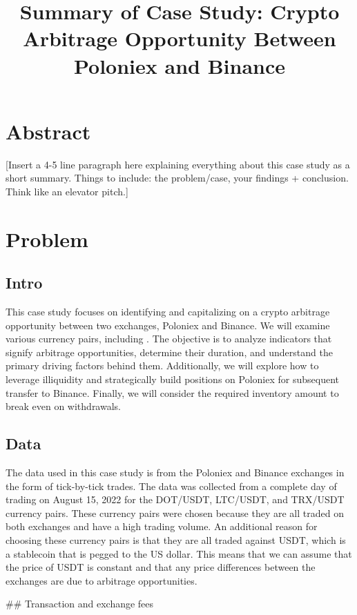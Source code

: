 \documentclass{article}
\begin{document}
\title{\textbf{Summary of Case Study: Crypto Arbitrage Opportunity Between Poloniex and Binance}}
\maketitle

\section{Abstract}
[Insert a 4-5 line paragraph here explaining everything about this case study as a short summary. Things to include: the problem/case, your findings + conclusion. Think like an elevator pitch.]

\section{Problem}
\subsection{Intro}
This case study focuses on identifying and capitalizing on a crypto arbitrage opportunity between two exchanges, Poloniex and Binance. We will examine various currency pairs, including  . The objective is to analyze indicators that signify arbitrage opportunities, determine their
duration, and understand the primary driving factors behind them. Additionally, we will explore how to
leverage illiquidity and strategically build positions on Poloniex for subsequent transfer to Binance. Finally,
we will consider the required inventory amount to break even on withdrawals.
\subsection{Data}
The data used in this case study is from the Poloniex and Binance exchanges in the form of tick-by-tick trades. The data was collected from a complete day of trading on August 15, 2022 for the DOT/USDT, LTC/USDT, and TRX/USDT currency pairs. These currency pairs were chosen because they are all traded on both exchanges and have a high trading volume. An additional reason for choosing these currency pairs is that they are all traded against USDT, which is a stablecoin that is pegged to the US dollar. This means that we can assume that the price of USDT is constant and that any price differences between the exchanges are due to arbitrage opportunities.


## Transaction and exchange fees
\end{document}
